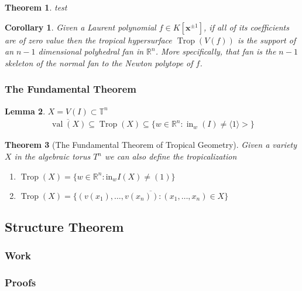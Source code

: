 \documentclass[12pt,a4paper]{amsart}
\newcommand{\trop}[1]{\operatorname{Trop}(#1)}
\newcommand{\val}[1]{\operatorname{val}(#1)}
\newcommand{\init}[2]{\operatorname{in}_{#1}(#2)}
\newcommand{\initw}[1]{\init{w}{#1}}
\newcommand{\R}{\mathbb{R}}
\newcommand{\T}{\mathbb{T}}
\newtheorem{thm}{Theorem}[section]
\newtheorem{cor}{Corollary}[thm]
\newtheorem{lem}[thm]{Lemma}
\theoremstyle{definition}
\theoremstyle{remark}
\begin{document}
\begin{thm}
test
\end{thm}

\begin{cor}
Given a Laurent polynomial $f\in K[\mathbf{x}^{\pm1}]$, if all of its coefficients are of zero value then the tropical hypersurface $\trop{V(f)}$ is the support of an $n-1$ dimensional polyhedral fan in $\R^n$. More specifically, that fan is the $n-1$ skeleton of the normal fan to the Newton polytope of $f$.
\end{cor}



\subsubsection{The Fundamental Theorem}

\begin{lem}
$X=V(I)\subset\T^n$
\begin{align*}
    \overline{\val{X}}\subseteq\trop{X}\subseteq\{ w\in\R^n : \initw{I} \neq \langle1\rangle> \}
\end{align*}
\end{lem}

\begin{thm}[The Fundamental Theorem of Tropical Geometry]
Given a variety $X$ in the algebraic torus $T^n$ we can also define the tropicalization
\begin{enumerate}
    \item $\trop{X} = \{ w\in\R^n : \text{in}_wI(X) \neq (1) \}$
    \item $\trop{X} = \overline{\{ (v(x_1),\dots,v(x_n)) : (x_1,\dots,x_n)\in X \}}$
\end{enumerate}
\end{thm}

\subsection{Structure Theorem}
\subsubsection{Work}
\subsubsection{Proofs}
\end{document}
